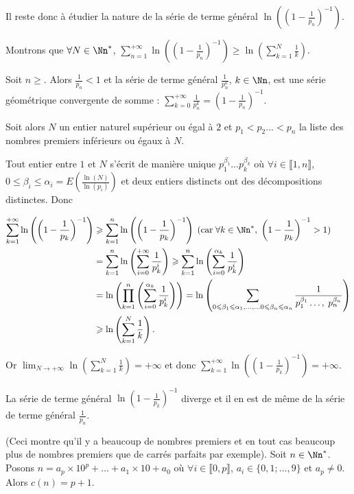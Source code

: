 {{Il reste donc à étudier la nature de la série de terme général $\ln\left(\left(1-\frac{1}{p_n}\right)^{-1}\right)$.

Montrons que $\forall N\in\Nn^*$,  $\sum_{n=1}^{+\infty}\ln\left(\left(1-\frac{1}{p_n}\right)^{-1}\right)\geqslant\ln\left(\sum_{k=1}^{N}\frac{1}{k}\right)$.

Soit $n\geqslant$. Alors $\frac{1}{p_n}<1$ et la série de terme général $\frac{1}{p_n^k}$, $k\in\Nn$, est une série géométrique convergente de somme : $\sum_{k=0}^{+\infty}\frac{1}{p_n^k}= \left(1-\frac{1}{p_n}\right)^{-1}$.

Soit alors $N$ un entier naturel supérieur ou égal à $2$ et $p_1 < p_2... < p_n$ la liste des nombres premiers inférieurs ou égaux à $N$.

Tout entier entre $1$ et $N$ s'écrit de manière unique $p_1^{\beta_1}\ldots p_k^{\beta_k}$ où $\forall i\in\llbracket1,n\rrbracket$, $0\leqslant\beta_i\leqslant\alpha_i=E\left(\frac{\ln(N)}{\ln(p_i)}\right)$ et deux entiers distincts ont des décompositions distinctes. Donc

\begin{align*}\ensuremath
\sum_{k=1}^{+\infty}\ln\left(\left(1-\frac{1}{p_k}\right)^{-1}\right)&\geqslant\sum_{k=1}^{n}\ln\left(\left(1-\frac{1}{p_k}\right)^{-1}\right)\;(\text{car}\;\forall k\in\Nn^*,\;\left(1-\frac{1}{p_k}\right)^{-1}> 1)\\
 &=\sum_{k=1}^{n}\ln\left(\sum_{i=0}^{+\infty}\frac{1}{p_k^i}\right)\geqslant\sum_{k=1}^{n}\ln\left(\sum_{i=0}^{\alpha_k}\frac{1}{p_k^i}\right)\\
  &=\ln\left(\prod_{k=1}^{n}\left(\sum_{i=0}^{\alpha_k}\frac{1}{p_k^i}\right)\right)=\ln\left(\sum_{0\leqslant\beta_1\leqslant\alpha_1,\ldots,\ldots0\leqslant\beta_n\leqslant\alpha_n}^{}\frac{1}{p_1^{\beta_1}\ldots,\;p_n^{\beta_n}}\right)\\
   &\geqslant\ln\left(\sum_{k=1}^{N}\frac{1}{k}\right).
\end{align*}

Or $\lim_{N \rightarrow +\infty}\ln\left(\sum_{k=1}^{N}\frac{1}{k}\right)=+\infty$ et donc $\sum_{k=1}^{+\infty}\ln\left(\left(1-\frac{1}{p_k}\right)^{-1}\right)=+\infty$.

La série de terme général $\ln\left(1-\frac{1}{p_k}\right)^{-1}$ diverge et il en est de même de la série de terme général $\frac{1}{p_n}$.

(Ceci montre qu'il y a beaucoup de nombres premiers et en tout cas beaucoup plus de nombres premiers que de carrés parfaits par exemple).
Soit $n\in\Nn^*$. Posons $n =a_p\times10^p+\ldots+a_1\times10+a_0$ où $\forall i\in\llbracket0,p\rrbracket$, $a_i\in\{0,1;...,9\}$ et $a_p\neq 0$. Alors $c(n) = p+1$.

}}
